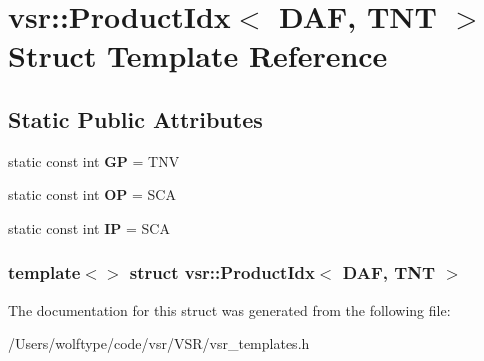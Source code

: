 \hypertarget{structvsr_1_1_product_idx_3_01_d_a_f_00_01_t_n_t_01_4}{\section{vsr\-:\-:Product\-Idx$<$ D\-A\-F, T\-N\-T $>$ Struct Template Reference}
\label{structvsr_1_1_product_idx_3_01_d_a_f_00_01_t_n_t_01_4}
}
\subsection*{Static Public Attributes}
\begin{DoxyCompactItemize}
\item 
\hypertarget{structvsr_1_1_product_idx_3_01_d_a_f_00_01_t_n_t_01_4_a87cae9d83bf10cc33aacbbac7f4ded67}{static const int {\bfseries G\-P} = T\-N\-V}\label{structvsr_1_1_product_idx_3_01_d_a_f_00_01_t_n_t_01_4_a87cae9d83bf10cc33aacbbac7f4ded67}

\item 
\hypertarget{structvsr_1_1_product_idx_3_01_d_a_f_00_01_t_n_t_01_4_a89882a12d17596d54af7f3b3803ac9d8}{static const int {\bfseries O\-P} = S\-C\-A}\label{structvsr_1_1_product_idx_3_01_d_a_f_00_01_t_n_t_01_4_a89882a12d17596d54af7f3b3803ac9d8}

\item 
\hypertarget{structvsr_1_1_product_idx_3_01_d_a_f_00_01_t_n_t_01_4_a274e6fc2a7194938692996bb04227ac6}{static const int {\bfseries I\-P} = S\-C\-A}\label{structvsr_1_1_product_idx_3_01_d_a_f_00_01_t_n_t_01_4_a274e6fc2a7194938692996bb04227ac6}

\end{DoxyCompactItemize}
\subsubsection*{template$<$$>$ struct vsr\-::\-Product\-Idx$<$ D\-A\-F, T\-N\-T $>$}



The documentation for this struct was generated from the following file\-:\begin{DoxyCompactItemize}
\item 
/\-Users/wolftype/code/vsr/\-V\-S\-R/vsr\-\_\-templates.\-h\end{DoxyCompactItemize}

